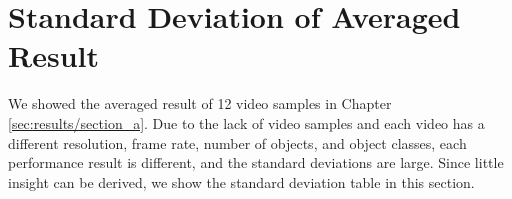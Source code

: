 \section{Standard Deviation of Averaged Result}
\label{sec:appendix/section_b}

We showed the averaged result of 12 video samples in Chapter \ref{sec:results/section_a}. Due to the lack of video samples and each video has a different resolution, frame rate, number of objects, and object classes, each performance result is different, and the standard deviations are large. Since little insight can be derived, we show the standard deviation table in this section.
